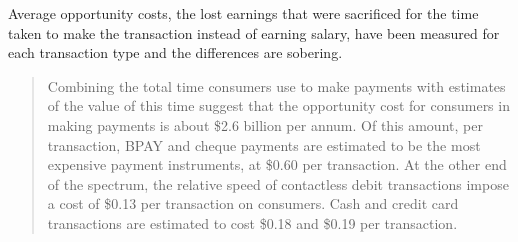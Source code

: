 Average opportunity costs, the lost earnings that were sacrificed for the time taken to make the transaction instead of earning salary,  have been measured for each transaction type and the differences are sobering.

\begin{quotation}
Combining the total time consumers use to make payments with estimates of the
value of this time suggest that the opportunity cost for consumers in making
payments is about \$2.6 billion per annum. Of this amount, per transaction, BPAY
and cheque payments are estimated to be the most expensive payment
instruments, at \$0.60 per transaction. At the other end of the spectrum, the
relative speed of contactless debit transactions impose a cost of \$0.13 per
transaction on consumers. Cash and credit card transactions are estimated to
cost \$0.18 and \$0.19 per transaction\cite[p5]{RefWorks:273}.
\end{quotation}



